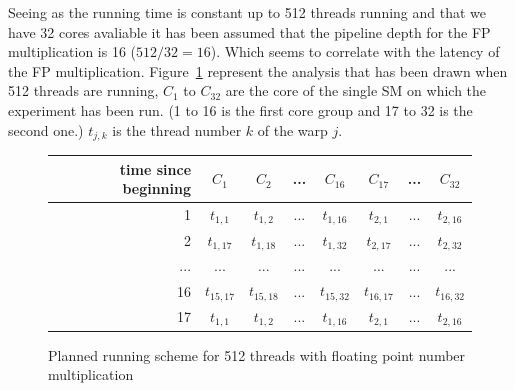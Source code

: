 \documentclass{article}
\begin{document}
    Seeing as the running time is constant up to 512 threads running and that we have 32 cores avaliable it has been assumed that the pipeline depth for the FP multiplication is 16 ($512/32 = 16$). Which seems to correlate with the latency of the FP multiplication.
    Figure~\ref{fig:fp_prediction_512} represent the analysis that has been drawn when 512 threads are running, $C_1$ to $C_{32}$ are the core of the single SM on which the experiment has been run. (1 to 16 is the first core group and 17 to 32 is the second one.) $t_{j,k}$ is the thread number $k$ of the warp $j$. 
        \begin{figure}[h]
      \centering
       \begin{tabular}{ | r || c | c | c | c | c | c | c | }
    	    \hline
    	    time since beginning & $C_1$ & $C_2$ & ... & $C_{16}$ & $C_{17}$ & ... & $C_{32}$ \\ \hline  \hline
    	   1 & $t_{1,1}$ & $t_{1,2}$ & ... & $t_{1,16}$ & $t_{2, 1}$ & ... & $t_{2, 16}$ \\ \hline 
    	   2 & $t_{1,17}$ & $t_{1,18}$ & ... & $t_{1,32}$ & $t_{2, 17}$ & ... & $t_{2, 32}$ \\ \hline
    	   ... & ... & ... & ... & ... & ... & ... & ... \\ \hline
    	   16 & $t_{15,17}$ & $t_{15,18}$ & ... & $t_{15,32}$ & $t_{16,17}$ & ... & $t_{16, 32}$ \\ \hline
    	   17 & $t_{1,1}$ & $t_{1,2}$ & ... & $t_{1,16}$ & $t_{2, 1}$ & ... & $t_{2, 16}$ \\ \hline
  	\end{tabular}
  	\captionsetup{justification=centering}
  	\caption{Planned running scheme for 512 threads with floating point number multiplication}
  	\label{fig:fp_prediction_512}
   \end{figure}
   
\end{document}

